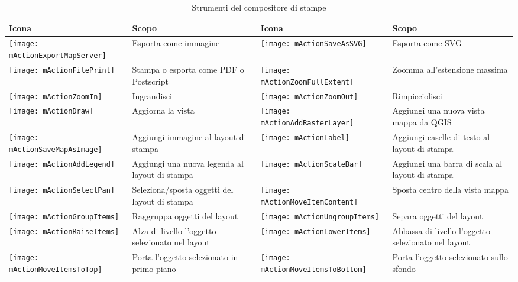 \begin{table}[h]
\centering
\caption{Strumenti del compositore di stampe}\label{tab:printcomposer_tools}\medskip
 \begin{tabular}{|l|p{6.9cm}|l|p{6.9cm}|}
 \hline \textbf{Icona} & \textbf{Scopo} & \textbf{Icona} &
 \textbf{Scopo} \\

 \hline \texttt{[image: mActionExportMapServer]}
 & Esporta come immagine & 
 \texttt{[image: mActionSaveAsSVG]} & Esporta come SVG \\
 \hline \texttt{[image: mActionFilePrint]} & Stampa o esporta
 come PDF o Postscript &
 \texttt{[image: mActionZoomFullExtent]} & Zoomma all'estensione
 massima \\
 \hline \texttt{[image: mActionZoomIn]} & Ingrandisci &
 \texttt{[image: mActionZoomOut]} & Rimpicciolisci \\
 \hline \texttt{[image: mActionDraw]} & Aggiorna la vista &
 \texttt{[image: mActionAddRasterLayer]} & Aggiungi una nuova
 vista mappa da QGIS \\
 \hline \texttt{[image: mActionSaveMapAsImage]} & Aggiungi
 immagine al layout di stampa &
 \texttt{[image: mActionLabel]} & Aggiungi caselle di testo al
 layout di stampa \\
 \hline \texttt{[image: mActionAddLegend]} & Aggiungi una nuova
 legenda al layout di stampa & 
 \texttt{[image: mActionScaleBar]} & Aggiungi una barra di scala
 al layout di stampa\\
 \hline \texttt{[image: mActionSelectPan]} & Seleziona/sposta
 oggetti del layout di stampa &
 \texttt{[image: mActionMoveItemContent]} & Sposta centro della
 vista mappa \\
 \hline \texttt{[image: mActionGroupItems]} & Raggruppa oggetti
 del layout & 
 \texttt{[image: mActionUngroupItems]} & Separa oggetti del
 layout \\
 \hline \texttt{[image: mActionRaiseItems]} & Alza di livello
 l'oggetto selezionato nel layout &
 \texttt{[image: mActionLowerItems]} & Abbassa di livello
 l'oggetto selezionato nel layout \\
 \hline \texttt{[image: mActionMoveItemsToTop]} & Porta l'oggetto
 selezionato in primo piano & 
 \texttt{[image: mActionMoveItemsToBottom]} & Porta l'oggetto
 selezionato sullo sfondo \\
\hline
\end{tabular}
\end{table}

